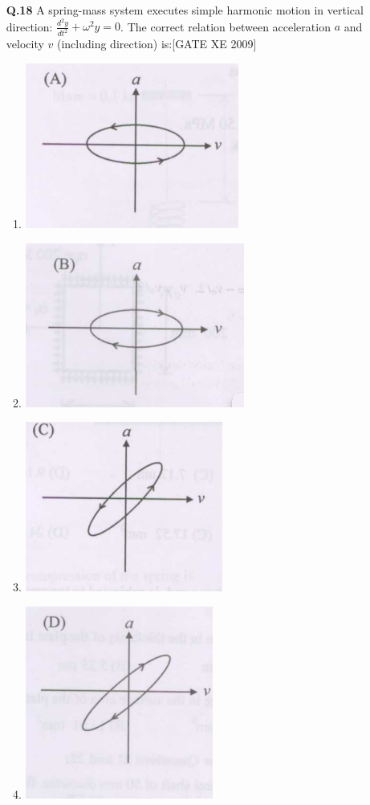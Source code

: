 \documentclass[journal,12pt,onecolumn]{IEEEtran}
\theoremstyle{remark}
\begin{document}
\begin{enumerate}
\begin{enumerate}
\item[\textbf{Q.18}] A spring-mass system executes simple harmonic motion in vertical direction: $\frac{d^2 y}{dt^2} + \omega^2 y = 0$. The correct relation between acceleration $a$ and velocity $v$ (including direction) is:\hfill[GATE XE 2009]\\
\begin{multicols}{2}
\begin{enumerate} 
\item \includegraphics[width=0.4\columnwidth]{figs/fig20.png} \item \includegraphics[width=0.4\columnwidth]{figs/fig21.png}
      
\item \includegraphics[width=0.4\columnwidth]{figs/fig22.png}   \item \includegraphics[width=0.4\columnwidth]{figs/fig23.png}
    \\
\end{enumerate}
\end{multicols}
   \clearpage



\end{enumerate}
\end{enumerate}
\end{document}
